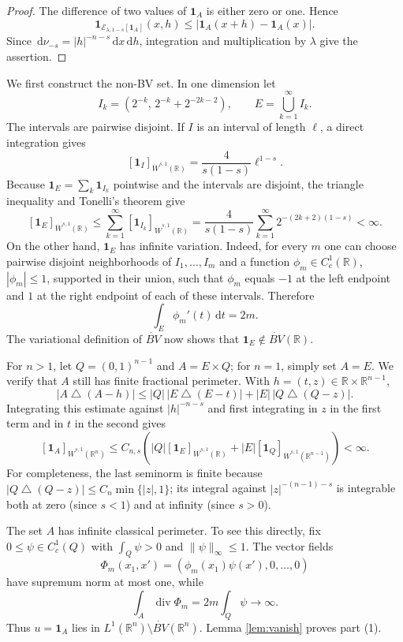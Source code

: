 \documentclass[11pt]{article}
\newcommand{\R}{\mathbb R}
\newcommand{\BV}{\dot{BV}}
\newcommand{\cE}{\mathcal E}
\newcommand{\dif}{\,\mathrm d}
\begin{document}
\begin{proof}
The difference of two values of $\mathbf1_A$ is either zero or one.  Hence
\[
 \mathbf1_{\cE_{\lambda,1-s}[\mathbf1_A]}(x,h)
 \leq |\mathbf1_A(x+h)-\mathbf1_A(x)|.
\]
Since $\dif\nu_{-s}=|h|^{-n-s}\dif x\dif h$, integration and multiplication
by $\lambda$ give the assertion.
\end{proof}

We first construct the non-BV set.  In one dimension let
\[
 I_k=\left(2^{-k},\,2^{-k}+2^{-2k-2}\right),\qquad
 E=\bigcup_{k=1}^{\infty}I_k.
\]
The intervals are pairwise disjoint.  If $I$ is an interval of length $\ell$,
a direct integration gives
\begin{equation}\label{eq:interval}
 [\mathbf1_I]_{\dot W^{s,1}(\R)}
 =\frac{4}{s(1-s)}\ell^{1-s}.
\end{equation}
Because $\mathbf1_E=\sum_k\mathbf1_{I_k}$ pointwise and the intervals are
disjoint, the triangle inequality and Tonelli's theorem give
\[
 [\mathbf1_E]_{\dot W^{s,1}(\R)}
 \leq\sum_{k=1}^{\infty}[\mathbf1_{I_k}]_{\dot W^{s,1}(\R)}
 =\frac4{s(1-s)}\sum_{k=1}^{\infty}
   2^{-(2k+2)(1-s)}<\infty.
\]
On the other hand, $\mathbf1_E$ has infinite variation.  Indeed, for every
$m$ one can choose pairwise disjoint neighborhoods of $I_1,\ldots,I_m$ and a
function $\phi_m\in C_c^1(\R)$, $|\phi_m|\leq1$, supported in their union,
such that $\phi_m$ equals $-1$ at the left endpoint and $1$ at the right
endpoint of each of these intervals.  Therefore
\[
 \int_E\phi_m'(t)\dif t=2m.
\]
The variational definition of $\BV$ now shows that
$\mathbf1_E\notin\BV(\R)$.

For $n>1$, let $Q=(0,1)^{n-1}$ and $A=E\times Q$; for $n=1$, simply set
$A=E$.  We verify that $A$ still has finite fractional perimeter.  With
$h=(t,z)\in\R\times\R^{n-1}$,
\[
 |A\mathbin\triangle(A-h)|
 \leq |Q|\,|E\mathbin\triangle(E-t)|
       +|E|\,|Q\mathbin\triangle(Q-z)|.
\]
Integrating this estimate against $|h|^{-n-s}$ and first integrating in $z$
in the first term and in $t$ in the second gives
\[
 [\mathbf1_A]_{\dot W^{s,1}(\R^n)}
 \leq C_{n,s}\left(
 |Q|[\mathbf1_E]_{\dot W^{s,1}(\R)}
 +|E|[\mathbf1_Q]_{\dot W^{s,1}(\R^{n-1})}
 \right)<\infty.
\]
For completeness, the last seminorm is finite because
$|Q\mathbin\triangle(Q-z)|\leq C_n\min\{|z|,1\}$; its integral against
$|z|^{-(n-1)-s}$ is integrable both at zero (since $s<1$) and at infinity
(since $s>0$).

The set $A$ has infinite classical perimeter.  To see this directly, fix
$0\leq\psi\in C_c^1(Q)$ with $\int_Q\psi>0$ and $\|\psi\|_\infty\leq1$.
The vector fields
\[
 \Phi_m(x_1,x')=(\phi_m(x_1)\psi(x'),0,\ldots,0)
\]
have supremum norm at most one, while
\[
 \int_A\operatorname{div}\Phi_m
 =2m\int_Q\psi\longrightarrow\infty.
\]
Thus $u=\mathbf1_A$ lies in $L^1(\R^n)\setminus\BV(\R^n)$.  Lemma
\ref{lem:vanish} proves part (1).
\end{document}

